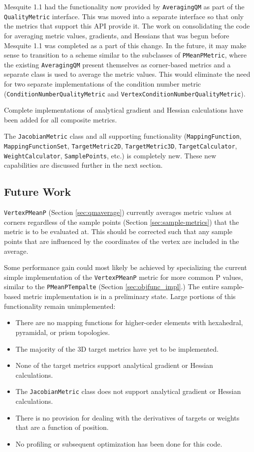 \documentclass{article}
\begin{document}
Mesquite 1.1 had the functionality now provided by \texttt{AveragingQM} as part of the \texttt{QualityMetric} interface.  This was moved into a separate interface so that only the metrics that support this API provide it.  The work on consolidating the code for averaging metric values, gradients, and Hessians that was begun before Mesquite 1.1 was completed as a part of this change.  In the future, it may make sense to transition to a scheme similar to the subclasses of \texttt{PMeanPMetric}, where the existing \texttt{AveragingQM} present themselves as corner-based metrics and a separate class is used to average the metric values.  This would eliminate the need for two separate implementations of the condition number metric (\texttt{ConditionNumberQualityMetric} and \texttt{VertexConditionNumberQualityMetric}).

Complete implementations of analytical gradient and Hessian calculations have been added for all composite metrics.  

The \texttt{JacobianMetric} class and all supporting functionality (\texttt{MappingFunction}, \texttt{MappingFunctionSet}, \texttt{TargetMetric2D}, \texttt{TargetMetric3D}, \texttt{TargetCalculator}, \texttt{WeightCalculator},
\texttt{SamplePoints}, etc.) is completely new.  These new capabilities are discussed further in the next section.


\subsection{Future Work}

 \texttt{VertexPMeanP} (Section \ref{sec:qmaverage}) currently averages metric values at corners regardless of the sample points (Section \ref{sec:sample-metrics}) that the metric is to be evaluated at.  This should be corrected such that any sample points that are influenced by the coordinates of the vertex are included in the average.
 
Some performance gain could most likely be achieved by specializing the current simple implementation of the \texttt{VertexPMeanP} metric for more common P values, similar to the \texttt{PMeanPTempalte} (Section \ref{sec:objfunc_impl}.) 
The entire sample-based metric implementation is in a preliminary state.  Large portions of this functionality remain unimplemented:
\begin{itemize}
\item There are no mapping functions for higher-order elements with hexahedral, pyramidal, or prism topologies.
\item The majority of the 3D target metrics have yet to be implemented.
\item None of the target metrics support analytical gradient or Hessian calculations.
\item The \texttt{JacobianMetric} class does not support analytical gradient or Hessian calculations.
\item There is no provision for dealing with the derivatives of targets or weights that are a function of position.
\item No profiling or subsequent optimization has been done for this code.
\end{itemize}
\end{document}
